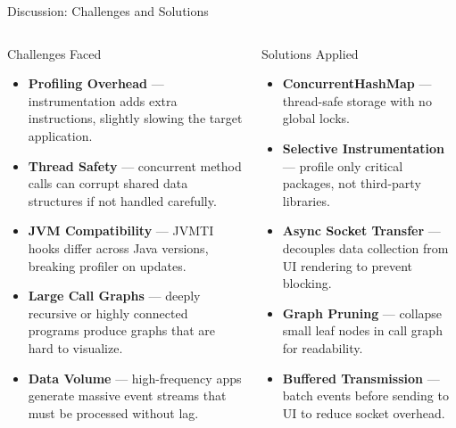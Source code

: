 \documentclass[aspectratio=169]{beamer}
\begin{document}
\begin{frame}{Discussion: Challenges and Solutions}
  \begin{columns}[T]
    \vspace{-6pt}
      \begin{alertblock}{Challenges Faced}
        \begin{itemize}\small\itemsep3pt
          \item \textbf{Profiling Overhead} — instrumentation adds extra instructions,
                slightly slowing the target application.
          \item \textbf{Thread Safety} — concurrent method calls can corrupt shared data
                structures if not handled carefully.
          \item \textbf{JVM Compatibility} — JVMTI hooks differ across Java versions,
                breaking profiler on updates.
          \item \textbf{Large Call Graphs} — deeply recursive or highly connected programs
                produce graphs that are hard to visualize.
          \item \textbf{Data Volume} — high-frequency apps generate massive event streams
                that must be processed without lag.
        \end{itemize}
      \end{alertblock}
      \begin{exampleblock}{Solutions Applied}
        \begin{itemize}\small\itemsep4pt
          \item \textbf{ConcurrentHashMap} — thread-safe storage with no global locks.
          \item \textbf{Selective Instrumentation} — profile only critical packages,
                not third-party libraries.
          \item \textbf{Async Socket Transfer} — decouples data collection from UI
                rendering to prevent blocking.
          \item \textbf{Graph Pruning} — collapse small leaf nodes in call graph
                for readability.
          \item \textbf{Buffered Transmission} — batch events before sending to UI
                to reduce socket overhead.
        \end{itemize}
      \end{exampleblock}
  \end{columns}
\end{frame}
\end{document}
